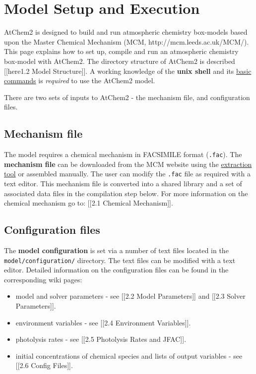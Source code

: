 \section{Model Setup and Execution} \label{sec:setup}

AtChem2 is designed to build and run atmospheric chemistry box-models
based upon the Master Chemical Mechanism (MCM,
http://mcm.leeds.ac.uk/MCM/). This page explains how to set up, compile
and run an atmospheric chemistry box-model with AtChem2. The directory
structure of AtChem2 is described {[}{[}here\textbar{}1.2 Model
Structure{]}{]}. A working knowledge of the \textbf{unix shell} and its
\href{https://swcarpentry.github.io/shell-novice/reference/}{basic
commands} is \emph{required} to use the AtChem2 model.

There are two sets of inputs to AtChem2 - the mechanism file, and
configuration files.

\subsection{Mechanism file}\label{mechanism-file}

The model requires a chemical mechanism in FACSIMILE format
(\texttt{.fac}). The \textbf{mechanism file} can be downloaded from the
MCM website using the
\href{http://mcm.leeds.ac.uk/MCMv3.3.1/extract.htt}{extraction tool} or
assembled manually. The user can modify the \texttt{.fac} file as
required with a text editor. This mechanism file is converted into a
shared library and a set of associated data files in the compilation
step below. For more information on the chemical mechanism go to:
{[}{[}2.1 Chemical Mechanism{]}{]}.

\subsection{Configuration files}\label{configuration-files}

The \textbf{model configuration} is set via a number of text files
located in the \texttt{model/configuration/} directory. The text files
can be modified with a text editor. Detailed information on the
configuration files can be found in the corresponding wiki pages:

\begin{itemize}
\item
  model and solver parameters - see {[}{[}2.2 Model Parameters{]}{]} and
  {[}{[}2.3 Solver Parameters{]}{]}.
\item
  environment variables - see {[}{[}2.4 Environment Variables{]}{]}.
\item
  photolysis rates - see {[}{[}2.5 Photolysis Rates and JFAC{]}{]}.
\item
  initial concentrations of chemical species and lists of output
  variables - see {[}{[}2.6 Config Files{]}{]}.
\end{itemize}

